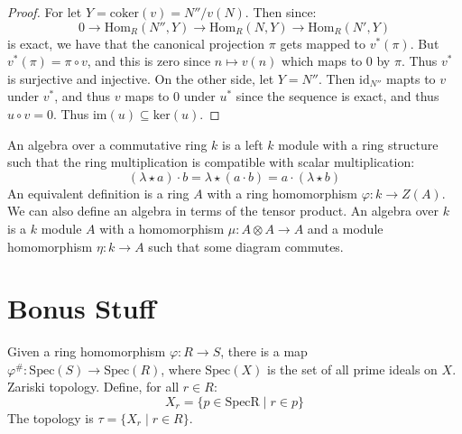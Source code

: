 \documentclass{article}                                                        %
\begin{document}
        \begin{proof}
            For let $Y=\textrm{coker}(v)=N''/v(N)$. Then since:
            \begin{equation}
                0\rightarrow\textrm{Hom}_{R}(N'',Y)
                \rightarrow\textrm{Hom}_{R}(N,Y)
                \rightarrow\textrm{Hom}_{R}(N',Y)
            \end{equation}
            is exact, we have that the canonical projection $\pi$ gets mapped
            to $v^{*}(\pi)$. But $v^{*}(\pi)=\pi\circ{v}$, and this is zero
            since $n\mapsto{v}(n)$ which maps to $0$ by $\pi$. Thus $v^{*}$ is
            surjective and injective. On the other side, let $Y=N''$. Then
            $\textrm{id}_{N''}$ mapts to $v$ under $v^{*}$, and thus
            $v$ maps to $0$ under $u^{*}$ since the sequence is exact, and
            thus $u\circ{v}=0$. Thus $\textrm{im}(u)\subseteq\textrm{ker}(u)$.
        \end{proof}
        An algebra over a commutative ring $k$ is a left $k$ module with a ring
        structure such that the ring multiplication is compatible with scalar
        multiplication:
        \begin{equation}
            (\lambda\star{a})\cdot{b}=\lambda\star(a\cdot{b})
                =a\cdot(\lambda\star{b})
        \end{equation}
        An equivalent definition is a ring $A$ with a ring homomorphism
        $\varphi:k\rightarrow{Z}(A)$. We can also define an algebra in terms of
        the tensor product. An algebra over $k$ is a $k$ module $A$ with a
        homomorphism $\mu:A\otimes{A}\rightarrow{A}$ and a module homomorphism
        $\eta:k\rightarrow{A}$ such that some diagram commutes.
    \section{Bonus Stuff}
        Given a ring homomorphism $\varphi:R\rightarrow{S}$, there is a map
        $\varphi^{\#}:\textrm{Spec}(S)\rightarrow\textrm{Spec}(R)$, where
        $\textrm{Spec}(X)$ is the set of all prime ideals on $X$.
        Zariski topology. Define, for all $r\in{R}$:
        \begin{equation}
            X_{r}=\{p\in\textrm{Spec{R}}\;|\;r\in{p}\}
        \end{equation}
        The topology is $\tau=\{X_{r}\;|\;r\in{R}\}$.
\end{document}
